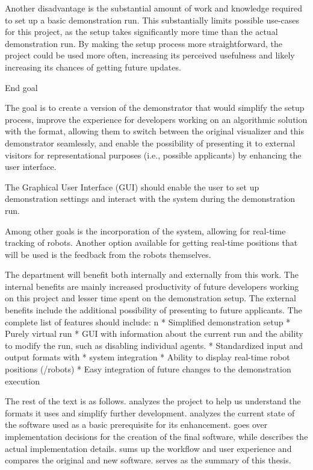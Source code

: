 Another disadvantage is the substantial amount of work and knowledge required to set up a basic demonstration run. This substantially limits possible use-cases for this project, as the setup takes significantly more time than the actual demonstration run. By making the setup process more straightforward, the project could be used more often, increasing its perceived usefulness and likely increasing its chances of getting future updates.

\sec End goal

The goal is to create a version of the demonstrator that would simplify the setup process, improve the experience for developers working on an algorithmic solution with the {\mapfIR} format, allowing them to switch between the original visualizer and this demonstrator seamlessly, and enable the possibility of presenting it to external visitors for representational purposes (i.e., possible applicants) by enhancing the user interface.

The Graphical User Interface (GUI) should enable the user to set up demonstration settings and interact with the system during the demonstration run.

Among other goals is the incorporation of the {\vicon} system, allowing for real-time tracking of robots. Another option available for getting real-time positions that will be used is the feedback from the robots themselves.

The department will benefit both internally and externally from this work. The internal benefits are mainly increased productivity of future developers working on this project and lesser time spent on the demonstration setup. The external benefits include the additional possibility of presenting to future applicants.
The complete list of features should include:
\begitems \style n
    * Simplified demonstration setup
    * Purely virtual run
    * GUI with information about the current run and the ability to modify the run, such as disabling individual agents. 
    * Standardized input and output formats with \mapfIR
    * {\vicon} system integration
    * Ability to display real-time robot positions ({\vicon}/robots)
    * Easy integration of future changes to the demonstration execution
\enditems

The rest of the text is as follows.
{} analyzes the {\mapfIR} project to help us understand the formats it uses and simplify further development. {} analyzes the current state of the software used as a basic prerequisite for its enhancement. {} goes over implementation decisions for the creation of the final software, while {} describes the actual implementation details. {} sums up the workflow and user experience and compares the original and new software. {} serves as the summary of this thesis.